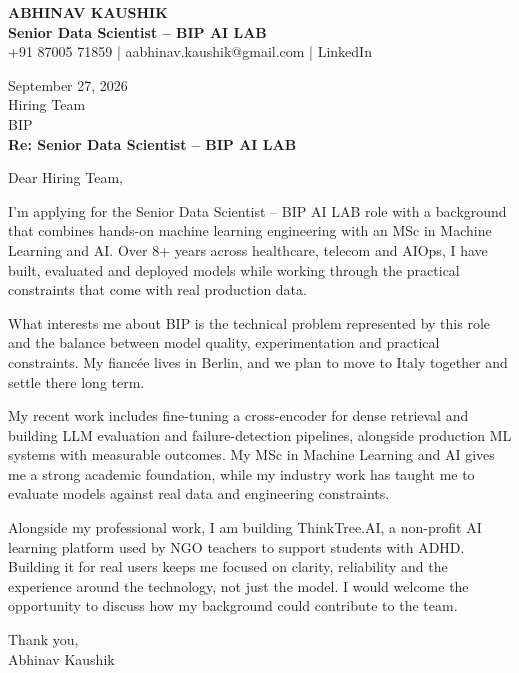 \documentclass[10pt,a4paper]{article}
\begin{document}
\begin{center}
{\Large\bfseries ABHINAV KAUSHIK}\\[2pt]
{\bfseries Senior Data Scientist – BIP AI LAB}\\[2pt]
+91 87005 71859 \quad | \quad aabhinav.kaushik@gmail.com \quad | \quad LinkedIn
\end{center}
\vspace{8pt}
September 27, 2026\\[6pt]
Hiring Team\\
BIP\\[4pt]
\textbf{Re: Senior Data Scientist – BIP AI LAB}

Dear Hiring Team,

I’m applying for the Senior Data Scientist – BIP AI LAB role with a background that combines hands-on machine learning engineering with an MSc in Machine Learning and AI. Over 8+ years across healthcare, telecom and AIOps, I have built, evaluated and deployed models while working through the practical constraints that come with real production data.

What interests me about BIP is the technical problem represented by this role and the balance between model quality, experimentation and practical constraints. My fiancée lives in Berlin, and we plan to move to Italy together and settle there long term.

My recent work includes fine-tuning a cross-encoder for dense retrieval and building LLM evaluation and failure-detection pipelines, alongside production ML systems with measurable outcomes. My MSc in Machine Learning and AI gives me a strong academic foundation, while my industry work has taught me to evaluate models against real data and engineering constraints.

Alongside my professional work, I am building ThinkTree.AI, a non-profit AI learning platform used by NGO teachers to support students with ADHD. Building it for real users keeps me focused on clarity, reliability and the experience around the technology, not just the model. I would welcome the opportunity to discuss how my background could contribute to the team.

Thank you,\\
Abhinav Kaushik
\end{document}
